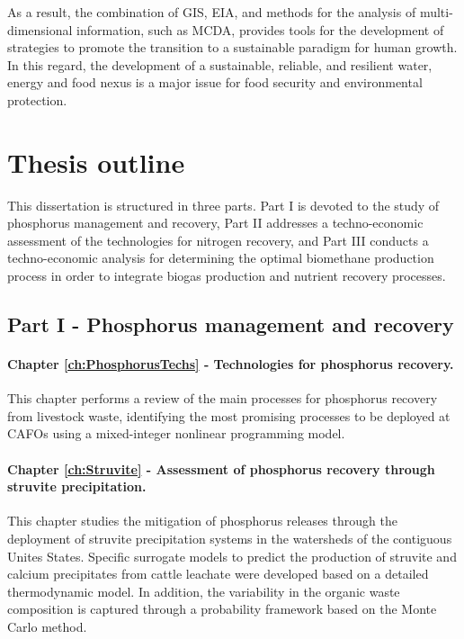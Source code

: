 \begin{refsection}[referencesCh1]
As a result, the combination of GIS, EIA, and methods for the analysis of multi-dimensional information, such as MCDA, provides tools for the development of strategies to promote the transition to a sustainable paradigm for human growth. In this regard, the development of a sustainable, reliable, and resilient water, energy and food nexus is a major issue for food security and environmental protection.

\section{Thesis outline}
This dissertation is structured in three parts. Part I is devoted to the study of phosphorus management and recovery, Part II addresses a techno-economic assessment of the technologies for nitrogen recovery, and Part III conducts a techno-economic analysis for determining the
optimal biomethane production process in order to integrate biogas production and nutrient recovery processes.

\subsection{Part I - Phosphorus management and recovery}
\paragraph{Chapter \ref{ch:PhosphorusTechs} - Technologies for phosphorus recovery.} This chapter performs a review of the main processes for phosphorus recovery from livestock waste, identifying the most promising processes to be deployed at CAFOs using a mixed-integer nonlinear programming model.

\paragraph{Chapter \ref{ch:Struvite} - Assessment of phosphorus recovery through struvite precipitation.} This chapter studies the mitigation of phosphorus releases through the deployment of struvite precipitation systems in the watersheds of the contiguous Unites States. Specific surrogate models to predict the production of struvite and calcium precipitates from cattle leachate were developed based on a detailed thermodynamic model. In addition, the variability in the organic waste composition is captured through a probability framework based on the Monte Carlo method.


\end{refsection}

